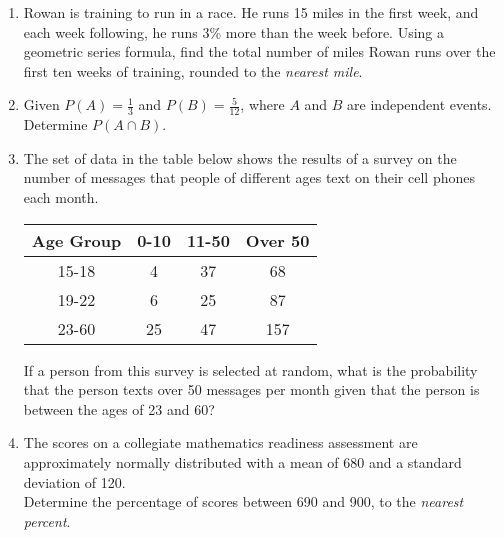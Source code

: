 \documentclass[12pt, twoside]{article}
\begin{document}
\begin{enumerate}
\item Rowan is training to run in a race. He runs 15 miles in the first week, and each week following, he runs 3\% more than the week before. Using a geometric series formula, find the total number of miles Rowan runs over the first ten weeks of training, rounded to the \emph{nearest mile}. %

\newpage
\item Given $P(A) = \frac{1}{3}$ and $P(B) = \frac{5}{12}$, where $A$ and $B$ are independent events. Determine $P(A \cap B)$. \vspace{3cm}

\item The set of data in the table below shows the results of a survey on the number of messages that people of different ages text on their cell phones each month.
\begin{center}
    \begin{tabular}{|c|c|c|c|}
        \hline
        Age Group & 0-10 & 11-50 & Over 50 \\
        \hline
        15-18 & 4 & 37 & 68 \\[0.25cm]
        \hline
        19-22 & 6 & 25 & 87 \\[0.25cm]
        \hline
        23-60 & 25 & 47 & 157 \\[0.25cm]
        \hline
    \end{tabular}
\end{center}
If a person from this survey is selected at random, what is the probability that the person texts over 50 messages per month given that the person is between the ages of 23 and 60?  \vspace{4cm}

\item The scores on a collegiate mathematics readiness assessment are approximately normally distributed with a mean of 680 and a standard deviation of 120.\\[0.5cm]
Determine the percentage of scores between 690 and 900, to the \emph{nearest percent}.\vspace{3cm}




\end{enumerate}
\end{document}
